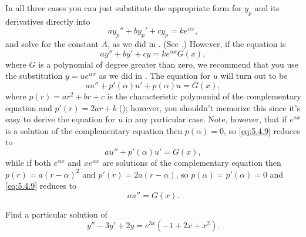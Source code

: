 In all three cases you can just substitute the appropriate form for
$y_p$ and its derivatives directly into
\[
ay_p''+by_p'+cy_p=ke^{\alpha x},
\]
and solve for the constant $A$, as we did in
.
 (See .)
However, if the equation is
\[
ay''+by'+cy=k e^{\alpha x}G(x),
\]
where $G$ is a polynomial of degree greater than zero, we recommend
that you use the substitution $y=ue^{\alpha x}$ as we did in
. The equation for $u$
will turn out to be
\begin{equation} \label{eq:5.4.9}
au''+p'(\alpha)u'+p(\alpha)u=G(x),
\end{equation}
where $p(r)=ar^2+br+c$ is the characteristic polynomial of the
complementary equation and $p'(r)=2ar+b$ ();
however, you shouldn't memorize this since it's easy to derive the
equation for $u$ in any particular case. Note, however, that if
$e^{\alpha x}$ is a solution of the complementary equation then
$p(\alpha)=0$, so \eqref{eq:5.4.9} reduces to
\[
au''+p'(\alpha)u'=G(x),
\]
while if both $e^{\alpha x}$ and $xe^{\alpha x}$ are solutions of the
complementary equation then $p(r)=a(r-\alpha)^2$ and
$p'(r)=2a(r-\alpha)$, so $p(\alpha)=p'(\alpha)=0$ and \eqref{eq:5.4.9}
reduces to
\[
au''=G(x).
\]

\begin{example}\label{example:5.4.4}
Find a particular solution of
\begin{equation} \label{eq:5.4.10}
y''-3y'+2y=e^{3x}(-1+2x+x^2).
\end{equation}
\end{example}


